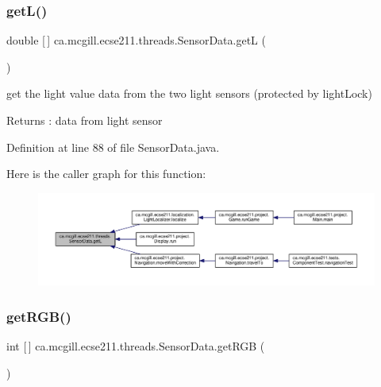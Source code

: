 \subsubsection{\texorpdfstring{get\+L()}{getL()}}
{\footnotesize\ttfamily double \mbox{[}$\,$\mbox{]} ca.\+mcgill.\+ecse211.\+threads.\+Sensor\+Data.\+getL (\begin{DoxyParamCaption}{ }\end{DoxyParamCaption})}

get the light value data from the two light sensors (protected by light\+Lock) \begin{DoxyReturn}{Returns}
\+: data from light sensor 
\end{DoxyReturn}


Definition at line 88 of file Sensor\+Data.\+java.

Here is the caller graph for this function\+:
\nopagebreak
\begin{figure}[H]
\begin{center}
\leavevmode
\includegraphics[width=350pt]{classca_1_1mcgill_1_1ecse211_1_1threads_1_1_sensor_data_a39eec50582f0e4bcff8a4669c48e1609_icgraph}
\end{center}
\end{figure}
\mbox{\label{classca_1_1mcgill_1_1ecse211_1_1threads_1_1_sensor_data_a76313564e284f5cdb66aefce4e595f3b}} 
\subsubsection{\texorpdfstring{get\+R\+G\+B()}{getRGB()}}
{\footnotesize\ttfamily int \mbox{[}$\,$\mbox{]} ca.\+mcgill.\+ecse211.\+threads.\+Sensor\+Data.\+get\+R\+GB (\begin{DoxyParamCaption}{ }\end{DoxyParamCaption})}

